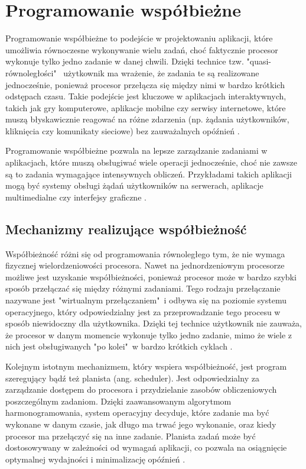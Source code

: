 \section{Programowanie współbieżne}

Programowanie współbieżne to podejście w projektowaniu aplikacji, które umożliwia równoczesne wykonywanie wielu zadań, choć faktycznie procesor wykonuje tylko jedno zadanie w danej chwili. Dzięki technice tzw. "quasi-równoległości"\ \cite{Paluch} użytkownik ma wrażenie, że zadania te są realizowane jednocześnie, ponieważ procesor przełącza się między nimi w bardzo krótkich odstępach czasu. Takie podejście jest kluczowe w aplikacjach interaktywnych, takich jak gry komputerowe, aplikacje mobilne czy serwisy internetowe, które muszą błyskawicznie reagować na różne zdarzenia (np. żądania użytkowników, kliknięcia czy komunikaty sieciowe) bez zauważalnych opóźnień \cite{MasteringConcurrencyAndParallelProgramming}.

Programowanie współbieżne pozwala na lepsze zarządzanie zadaniami w aplikacjach, które muszą obsługiwać wiele operacji jednocześnie, choć nie zawsze są to zadania wymagające intensywnych obliczeń. Przykładami takich aplikacji mogą być systemy obsługi żądań użytkowników na serwerach, aplikacje multimedialne czy interfejsy graficzne \cite{IntroductionToConcurrencyAndParallelism}.

\subsection{Mechanizmy realizujące współbieżność}
Współbieżność różni się od programowania równoległego tym, że nie wymaga fizycznej wielordzeniowości procesora. Nawet na jednordzeniowym procesorze możliwe jest uzyskanie współbieżności, ponieważ procesor może w bardzo szybki sposób przełączać się między różnymi zadaniami. Tego rodzaju przełączanie nazywane jest "wirtualnym przełączaniem"\ i odbywa się na poziomie systemu operacyjnego, który odpowiedzialny jest za przeprowadzanie tego procesu w sposób niewidoczny dla użytkownika. Dzięki tej technice użytkownik nie zauważa, że procesor w danym momencie wykonuje tylko jedno zadanie, mimo że wiele z nich jest obsługiwanych "po kolei"\ w bardzo krótkich cyklach \cite{ConcurrencyInAction, RustAtomicsAndLocks}.

Kolejnym istotnym mechanizmem, który wspiera współbieżność, jest program szeregujący bądź też planista (ang. scheduler). Jest odpowiedzialny za zarządzanie dostępem do procesora i przydzielanie zasobów obliczeniowych poszczególnym zadaniom. Dzięki zaawansowanym algorytmom harmonogramowania, system operacyjny decyduje, które zadanie ma być wykonane w danym czasie, jak długo ma trwać jego wykonanie, oraz kiedy procesor ma przełączyć się na inne zadanie. Planista zadań może być dostosowywany w zależności od wymagań aplikacji, co pozwala na osiągnięcie optymalnej wydajności i minimalizację opóźnień \cite{ConcurrencyInAction}.

